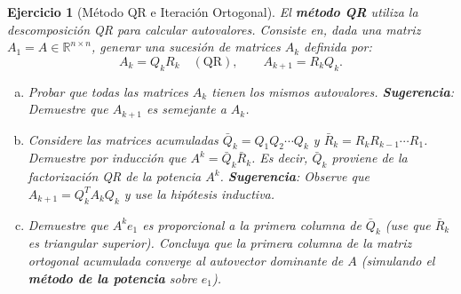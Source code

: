 \documentclass[12pt]{article}
\newtheorem{exercise}{Ejercicio}
\begin{document}
\begin{exercise}[Método QR e Iteración Ortogonal]
El \textbf{método QR} utiliza la descomposición QR para calcular autovalores. Consiste en, dada una matriz $A_1 = A \in \mathbb{R}^{n \times n}$, generar una sucesión de matrices $A_k$ definida por:
\[
A_k = Q_k R_k \quad (\text{QR}), \qquad A_{k+1} = R_k Q_k.
\]
\begin{enumerate}[(a)]
\item Probar que todas las matrices $A_k$ tienen los mismos autovalores.
\textbf{Sugerencia}: Demuestre que $A_{k+1}$ es semejante a $A_k$.
\item Considere las matrices acumuladas $\bar{Q}_k = Q_1 Q_2 \cdots Q_k$ y $\bar{R}_k = R_k R_{k-1} \cdots R_1$.
Demuestre por inducción que $A^k = \bar{Q}_k \bar{R}_k$. Es decir, $\bar{Q}_k$ proviene de la factorización QR de la potencia $A^k$.
\textbf{Sugerencia}: Observe que $A_{k+1} = Q_k^T A_k Q_k$ y use la hipótesis inductiva.
\item Demuestre que $A^k e_1$ es proporcional a la primera columna de $\bar{Q}_k$ (use que $\bar{R}_k$ es triangular superior). Concluya que la primera columna de la matriz ortogonal acumulada converge al autovector dominante de $A$ (simulando el \textbf{método de la potencia} sobre $e_1$).
\end{enumerate}
\end{exercise}

\end{document}
